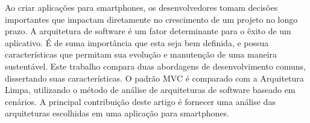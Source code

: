 Ao criar aplicações para smartphones, os desenvolvedores tomam decisões importantes que impactam diretamente no crescimento de um projeto no longo prazo.
A arquitetura de software é um fator determinante para o êxito de um aplicativo.
É de suma importância que esta seja bem definida, e possua características que permitam sua evolução e manutenção de uma maneira sustentável.
Este trabalho compara duas abordagens de desenvolvimento comuns, dissertando suas características.
O padrão MVC é comparado com a Arquitetura Limpa, utilizando o método de análise de arquiteturas de software baseado em cenários.
A principal contribuição deste artigo é fornecer uma análise das arquiteturas escolhidas em uma aplicação para smartphones.